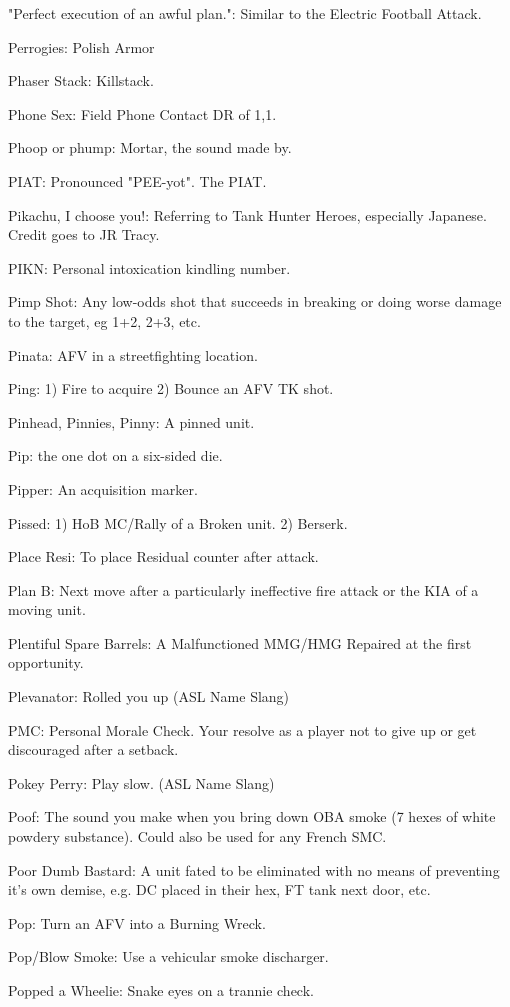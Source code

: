 \documentclass[letterpaper]{article}
\begin{document}
"Perfect execution of an awful plan.": Similar to the Electric Football Attack.

Perrogies: Polish Armor

Phaser Stack: Killstack.

Phone Sex: Field Phone Contact DR of 1,1.

Phoop or phump: Mortar, the sound made by.

PIAT: Pronounced "PEE-yot". The PIAT.

Pikachu, I choose you!: Referring to Tank Hunter Heroes, especially Japanese. Credit goes to JR Tracy.

PIKN: Personal intoxication kindling number.

Pimp Shot: Any low-odds shot that succeeds in breaking or doing worse damage to the target, eg 1+2, 2+3, etc.

Pinata:  AFV in a streetfighting location.

Ping: 1) Fire to acquire 2) Bounce an AFV TK shot.

Pinhead, Pinnies, Pinny: A pinned unit.

Pip: the one dot on a six-sided die.

Pipper: An acquisition marker.

Pissed: 1) HoB MC/Rally of a Broken unit. 2) Berserk.

Place Resi: To place Residual counter after attack.

Plan B:  Next move after a particularly ineffective fire attack or the KIA of a moving unit.

Plentiful Spare Barrels: A Malfunctioned MMG/HMG Repaired at the first opportunity.

Plevanator: Rolled you up (ASL Name Slang)

PMC: Personal Morale Check. Your resolve as a player not to give up or get discouraged after a setback.

Pokey Perry: Play slow. (ASL Name Slang)

Poof: The sound you make when you bring down OBA smoke (7 hexes of white powdery substance). Could also be used for any French SMC.

Poor Dumb Bastard: A unit fated to be eliminated with no means of preventing it's own demise, e.g. DC placed in their hex, FT tank next door, etc.

Pop: Turn an AFV into a Burning Wreck.

Pop/Blow Smoke: Use a vehicular smoke discharger.

Popped a Wheelie:  Snake eyes on a trannie check.
\end{document}
